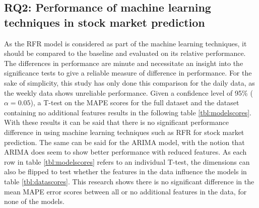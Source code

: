 \subsection{RQ2: Performance of machine learning techniques in stock market prediction}
As the RFR model is considered as part of the machine learning techniques, it should be compared to the baseline and evaluated on its relative performance. The differences in performance are minute and necessitate an insight into the significance tests to give a reliable measure of difference in performance. For the sake of simplicity, this study has only done this comparison for the daily data, as the weekly data shows unreliable performance. Given a confidence level of 95\% ($\alpha = 0.05$), a T-test on the MAPE scores for the full dataset and the dataset containing no additional features results in the following table \ref{tbl:modelscores}.
With these results it can be said that there is no significant performance difference in using machine learning techniques such as RFR for stock market prediction. The same can be said for the ARIMA model, with the notion that ARIMA does seem to show better performance with reduced features. As each row in table \ref{tbl:modelscores} refers to an individual T-test, the dimensions can also be flipped to test whether the features in the data influence the models in table \ref{tbl:datascores}.
This research shows there is no significant difference in the mean MAPE error scores between all or no additional features in the data, for none of the models.